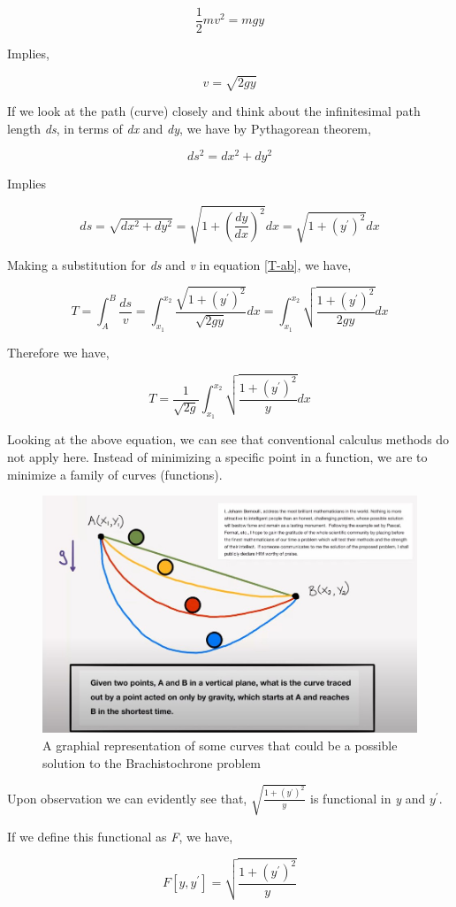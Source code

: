 	$$\frac{1}{2}mv^2 = mgy$$ 

{Implies,}

	$$v = \sqrt{2gy}$$

{If we look at the path (curve) closely and think about the infinitesimal path length \textit{ds}, in terms of \textit{dx} and \textit{dy}, we have by Pythagorean theorem,}

	$$ds^2 = dx^2 + dy^2$$

{Implies}

	$$ds = \sqrt{dx^2 + dy^2} = \sqrt{1 + \left(\frac{dy}{dx}\right)^2} dx = \sqrt{1 + \left(y^{\prime}\right)^2} dx$$

{Making a substitution for \textit{ds} and \textit{v} in equation \ref{T-ab}, we have,}

	$$T = \int_{A}^{B} \frac{ds}{v} = \int_{x_1}^{x_2} \frac{\sqrt{1 + \left(y^{\prime}\right)^2}}{\sqrt{2gy}} dx = \int_{x_1}^{x_2} \sqrt{\frac{1 + \left(y^{\prime}\right)^2}{2gy}} dx$$

{Therefore we have,}

	\begin{equation}
		T = \frac{1}{\sqrt{2g}}\int_{x_1}^{x_2} \sqrt{\frac{1 + \left(y^{\prime}\right)^2}{y}} dx
		\label{Tmin}
	\end{equation}

{Looking at the above equation, we can see that conventional calculus methods do not apply here. Instead of minimizing a specific point in a function, we are to minimize a family of curves (functions).}

\begin{figure}[H]
\centering
\includegraphics[width=15cm]{OrgProbDia.jpg}
    		\caption{{A graphial representation of some curves that could be a possible solution to the Brachistochrone problem}}
\end{figure}

{Upon observation we can evidently see that, $\sqrt{\frac{1 + \left(y^{\prime}\right)^2}{y}}$ is functional in \textit{y} and \textit{$y^\prime$}.}

{If we define this functional as \textit{F}, we have,}

	$$F[y,y^{\prime}] = \sqrt{\frac{1 + \left(y^{\prime}\right)^2}{y}}$$


